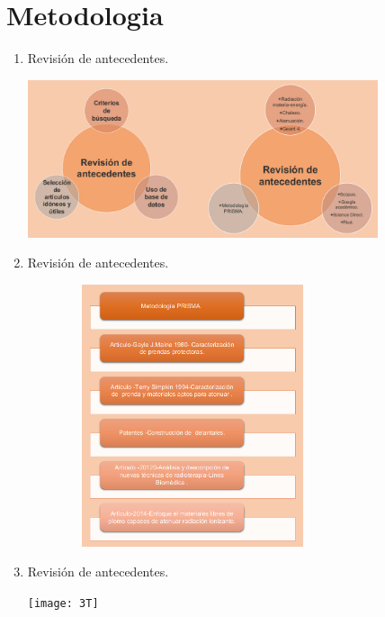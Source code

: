 \documentclass{beamer}
\begin{document}
\section{Metodologia}
\begin{enumerate} 
 \item Revisión de antecedentes. 
\begin{center}
\includegraphics[width=10.3cm,height=7.9
cm]{T}
\end{center}
\newpage
\item Revisión de antecedentes. 
\begin{center}
\includegraphics[width=9.7cm,height=7.7cm]{2T.png}
\end{center}
\newpage
\item Revisión de antecedentes. 
\begin{center}
\texttt{[image: 3T]}
\end{center}





\end{enumerate}
\end{document}
